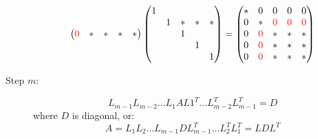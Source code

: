 \documentclass[ComputationalMathematics.tex]{subfiles}
\begin{document}
\begin{description}
\[\begin{pmatrix}
    {\color{red} 0} & \ast & \ast & \ast & \ast\\
\end{pmatrix}
\begin{pmatrix}
    1\\
    & 1 & \ast & \ast & \ast\\
    & & 1\\
    & & & 1\\
    & & & &1\\
\end{pmatrix}
=
\begin{pmatrix}
	\ast & 0 & 0 & 0 & 0\\
	0 & \ast & {\color{red} 0} & {\color{red} 0} & {\color{red} 0}\\
	0 & {\color{red} 0} & \ast & \ast & \ast\\
	0 & {\color{red} 0} & \ast & \ast & \ast\\
	0 & {\color{red} 0} & \ast & \ast & \ast\\
\end{pmatrix}
\]

\item[{\sc Step $m$:}] 
  \[
L_{m-1}L_{m-2}\dots L_1 A L1^T \dots L_{m-2}^T L_{m-1}^T = D
\]
where $D$ is diagonal, or:
\[
A = L_1 L_2 \dots L_{m-1} D L_{m-1}^T \dots L_2^T L_1^T = LDL^T
\]
\end{description}
\end{document}
